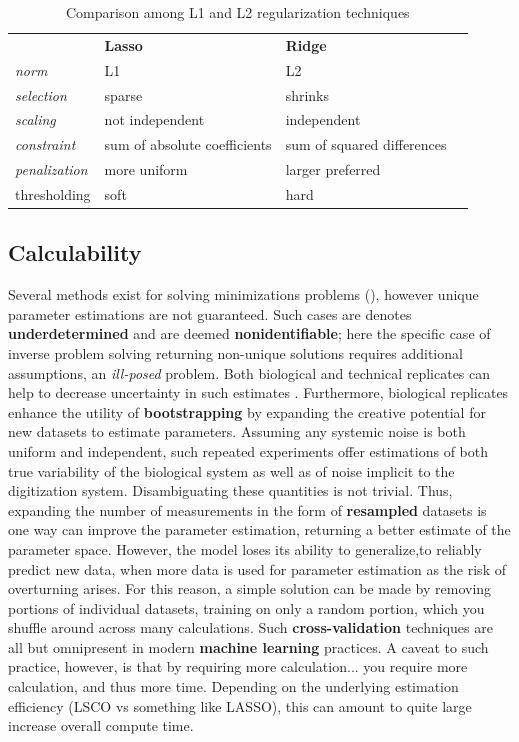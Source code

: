 \begin{table}[H]
\begin{tabular}{|l|l|l|l}
\cline{1-3}
 & \textbf{Lasso} &  \textbf{Ridge} &  \\ \cline{1-3}
\textit{norm} & L1 &  L2 &  \\ \cline{1-3}
\textit{selection} & sparse  & shrinks &  \\ \cline{1-3}
\textit{scaling} & not independent &  independent &  \\ \cline{1-3}
\textit{constraint} &sum of absolute coefficients& sum of squared differences&  \\ \cline{1-3}
\textit{penalization} & more uniform &  larger preferred &  \\ \cline{1-3}
thresholding & soft &  hard &  \\ \cline{1-3}
\end{tabular}
\caption{Comparison among L1 and L2 regularization techniques}
\label{table:regularization}
\end{table}

\subsection{Calculability}
\label{sec:calc}
Several methods exist for solving minimizations problems (), however unique parameter estimations are not guaranteed. Such cases are denotes \textbf{underdetermined} and are deemed \textbf{nonidentifiable}; here the specific case of inverse problem solving returning non-unique solutions requires additional assumptions, \ie an \emph{ill-posed} problem. Both biological and technical replicates can help to decrease uncertainty in such estimates \citep{lee2000importance}. Furthermore, biological replicates enhance the utility of \textbf{bootstrapping} by expanding the creative potential for new datasets to estimate parameters. Assuming any systemic noise is both uniform and independent, such repeated experiments offer estimations of both true variability of the biological system as well as of noise implicit to the digitization system. Disambiguating these quantities is not trivial. Thus, expanding the number of measurements in the form of \textbf{resampled} datasets is one way can improve the parameter estimation, returning a better estimate of the parameter space. However, the model loses its ability to generalize,\ie to reliably predict new data, when more data is used for parameter estimation as the risk of overturning arises. For this reason, a simple solution can be made by removing portions of individual datasets, training on only a random portion, which you shuffle around across many calculations. Such \textbf{cross-validation} techniques are all but omnipresent in modern \textbf{machine learning} practices. A caveat to such practice, however, is that by requiring more calculation... you require more calculation, and thus more time. Depending on the underlying estimation efficiency (LSCO vs something like LASSO), this can amount to quite large increase overall compute time.


